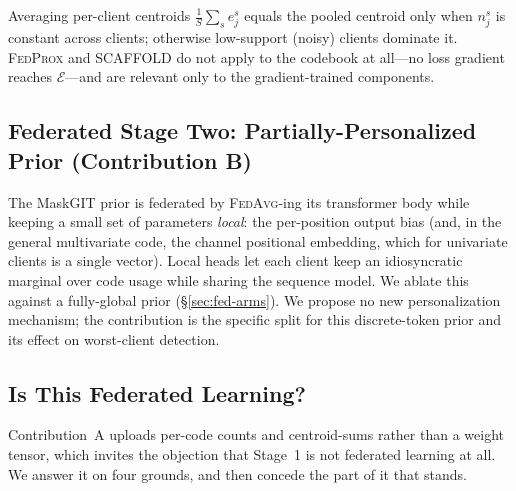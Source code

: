 \begin{remark}
Averaging per-client centroids $\tfrac{1}{S}\sum_s e^{s}_j$ equals the pooled centroid only
when $n^{s}_j$ is constant across clients; otherwise low-support (noisy) clients dominate
it. \textsc{FedProx} and \textsc{SCAFFOLD} do not apply to the codebook at all---no loss
gradient reaches $\mathcal{E}$---and are relevant only to the gradient-trained components.
\end{remark}

\subsection{Federated Stage Two: Partially-Personalized Prior (Contribution B)}
\label{sec:fed-stage2}
The MaskGIT prior is federated by \textsc{FedAvg}-ing its transformer body while keeping a
small set of parameters \emph{local}: the per-position output bias (and, in the general
multivariate code, the channel positional embedding, which for univariate clients is a
single vector). Local heads let each client keep an idiosyncratic marginal over code usage
while sharing the sequence model. We ablate this against a fully-global prior
(\S\ref{sec:fed-arms}). We propose no new personalization mechanism; the contribution is
the specific split for this discrete-token prior and its effect on worst-client detection.

\subsection{Is This Federated Learning?}
\label{sec:fed-isfl}
Contribution~A uploads per-code counts and centroid-sums rather than a weight tensor,
which invites the objection that Stage~1 is not federated learning at all. We answer it on
four grounds, and then concede the part of it that stands.


